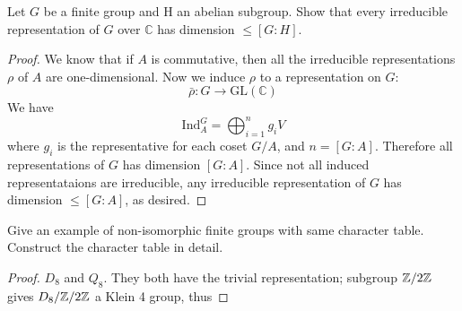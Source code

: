 \begin{prob}[S2017-Q6]
    Let $G$ be a finite group and H an abelian subgroup. Show that every
    irreducible representation of $G$ over $\mathbb{C}$ has dimension 
    $\leq[G : H]$.
\end{prob}
\begin{proof}
    We know that if $A$ is commutative, then all the irreducible representations $\rho$ of $A$ are one-dimensional. Now we induce $\rho$ to a representation on $G$:
    \begin{equation*}
        \bar{\rho}:G\to\text{GL}(\mathbb{C})
    \end{equation*}
    We have 
    \begin{equation*}
        \text{Ind}_A^G=\bigoplus_{i=1}^n g_iV
    \end{equation*}
    where $g_i$ is the representative for each coset $G/A$, and $n=[G:A]$. Therefore all representations of $G$ has dimension $[G:A]$. Since not all induced representataions are irreducible, any irreducible representation of $G$ has dimension $\leq[G:A]$, as desired.
\end{proof}

\begin{prob}[S2008-Q6]
    Give an example of non-isomorphic finite groups with same character
table. Construct the character table in detail.
\end{prob}
\begin{proof}
    $D_8$ and $Q_8$. They both have the trivial representation; subgroup $\mathbb{Z}/2\mathbb{Z}$ gives $D_8/\mathbb{Z}/2\mathbb{Z}$ a Klein 4 group, thus 
\end{proof}

